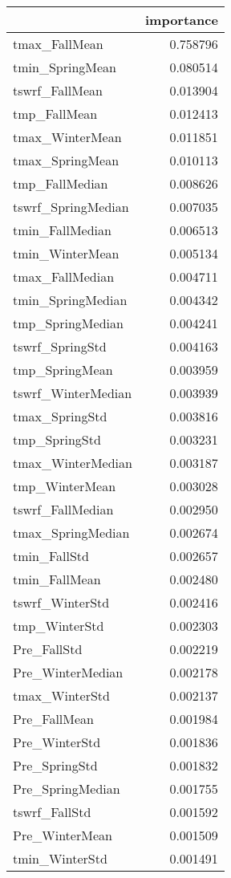 \begin{tabular}{lr}
\toprule
 & importance \\
\midrule
tmax_FallMean & 0.758796 \\
tmin_SpringMean & 0.080514 \\
tswrf_FallMean & 0.013904 \\
tmp_FallMean & 0.012413 \\
tmax_WinterMean & 0.011851 \\
tmax_SpringMean & 0.010113 \\
tmp_FallMedian & 0.008626 \\
tswrf_SpringMedian & 0.007035 \\
tmin_FallMedian & 0.006513 \\
tmin_WinterMean & 0.005134 \\
tmax_FallMedian & 0.004711 \\
tmin_SpringMedian & 0.004342 \\
tmp_SpringMedian & 0.004241 \\
tswrf_SpringStd & 0.004163 \\
tmp_SpringMean & 0.003959 \\
tswrf_WinterMedian & 0.003939 \\
tmax_SpringStd & 0.003816 \\
tmp_SpringStd & 0.003231 \\
tmax_WinterMedian & 0.003187 \\
tmp_WinterMean & 0.003028 \\
tswrf_FallMedian & 0.002950 \\
tmax_SpringMedian & 0.002674 \\
tmin_FallStd & 0.002657 \\
tmin_FallMean & 0.002480 \\
tswrf_WinterStd & 0.002416 \\
tmp_WinterStd & 0.002303 \\
Pre_FallStd & 0.002219 \\
Pre_WinterMedian & 0.002178 \\
tmax_WinterStd & 0.002137 \\
Pre_FallMean & 0.001984 \\
Pre_WinterStd & 0.001836 \\
Pre_SpringStd & 0.001832 \\
Pre_SpringMedian & 0.001755 \\
tswrf_FallStd & 0.001592 \\
Pre_WinterMean & 0.001509 \\
tmin_WinterStd & 0.001491 \\

\end{tabular}
